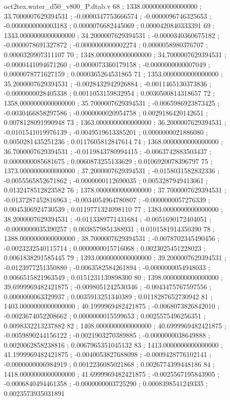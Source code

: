 \begin{filecontents}[overwrite]{oct2tex.water_d50_v800_P.dtab.v}
68 ; 1338.0000000000000000 ; 33.7000007629394531 ; -0.0000347753666574 ; -0.0000096746325653 ; -0.0000000000003183 ; 0.0000076682445069 ; 0.0000420840333391
69 ; 1343.0000000000000000 ; 34.2000007629394531 ; -0.0000340360675182 ; -0.0000078691327872 ; -0.0000000000002274 ; 0.0000058980376707 ; 0.0000320907311107
70 ; 1348.0000000000000000 ; 34.7000007629394531 ; -0.0000441094671260 ; -0.0000073360179158 ; -0.0000000000007049 ; 0.0000078771627159 ; 0.0000365264531865
71 ; 1353.0000000000000000 ; 35.2000007629394531 ; -0.0028432942926884 ; -0.0011465130373836 ; -0.0000000028405338 ; 0.0011053159832954 ; 0.0030500814318657
72 ; 1358.0000000000000000 ; 35.7000007629394531 ; -0.0065986923873425 ; -0.0030466858297586 ; -0.0000000020954758 ; 0.0029186420142651 ; 0.0078128091990948
73 ; 1363.0000000000000000 ; 36.2000007629394531 ; -0.0101541019976139 ; -0.0049519613385201 ; 0.0000000021886080 ; 0.0050281435251236 ; 0.0117605812847614
74 ; 1368.0000000000000000 ; 36.7000007629394531 ; -0.0119843780994415 ; -0.0063742883503437 ; 0.0000000085681675 ; 0.0060873255133629 ; 0.0106920078396797
75 ; 1373.0000000000000000 ; 37.2000007629394531 ; -0.0158031582832336 ; -0.0055565852671862 ; -0.0000000112690035 ; 0.0053287949413061 ; 0.0132478512823582
76 ; 1378.0000000000000000 ; 37.7000007629394531 ; -0.0137287452816963 ; -0.0034054964780807 ; -0.0000000057276339 ; 0.0045306924730539 ; 0.0119771324098110
77 ; 1383.0000000000000000 ; 38.2000007629394531 ; -0.0113389771431684 ; -0.0051690172404051 ; -0.0000000035390257 ; 0.0038579851388931 ; 0.0101581914350390
78 ; 1388.0000000000000000 ; 38.7000007629394531 ; -0.0078702345490456 ; -0.0023232540115714 ; 0.0000000015716068 ; 0.0023025451228023 ; 0.0061838291585445
79 ; 1393.0000000000000000 ; 39.2000007629394531 ; -0.0123977251350880 ; -0.0063582584261894 ; -0.0000000054948033 ; 0.0066515821963549 ; 0.0151231139898300
80 ; 1398.0000000000000000 ; 39.6999969482421875 ; -0.0098051242530346 ; -0.0043475767597556 ; 0.0000000063329937 ; 0.0035913251340389 ; 0.0118287652730942
81 ; 1403.0000000000000000 ; 40.1999969482421875 ; -0.0068073826842010 ; -0.0023674052208662 ; 0.0000000015599653 ; 0.0025575496256351 ; 0.0098332213237882
82 ; 1408.0000000000000000 ; 40.6999969482421875 ; -0.0059890244156122 ; -0.0021903270389885 ; -0.0000000038649888 ; 0.0020062858238816 ; 0.0067965351045132
83 ; 1413.0000000000000000 ; 41.1999969482421875 ; -0.0040053827688098 ; -0.0009428776102141 ; -0.0000000006984919 ; 0.0012236085021868 ; 0.0026774399448186
84 ; 1418.0000000000000000 ; 41.6999969482421875 ; -0.0025567195843905 ; -0.0006840494461358 ; -0.0000000003725290 ; 0.0008398541249335 ; 0.0023573935031891

\end{filecontents}
